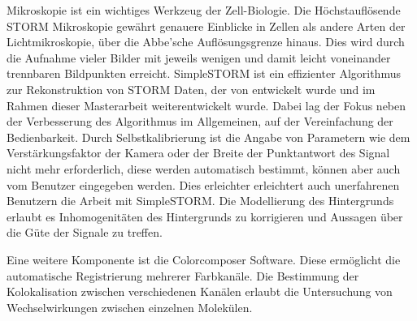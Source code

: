 Mikroskopie ist ein wichtiges Werkzeug der Zell-Biologie. Die H\"ochstaufl\"osende STORM Mikroskopie gew\"ahrt genauere Einblicke in Zellen als andere Arten der Lichtmikroskopie, \"uber die Abbe'sche Aufl\"osungsgrenze hinaus. Dies wird durch die Aufnahme vieler Bilder mit jeweils wenigen und damit leicht voneinander trennbaren Bildpunkten erreicht.\newline
SimpleSTORM ist ein effizienter Algorithmus zur Rekonstruktion von STORM Daten, der von \cite{MAJoachim} entwickelt wurde und im Rahmen dieser Masterarbeit weiterentwickelt wurde.\newline 
Dabei lag der Fokus neben der Verbesserung des Algorithmus im Allgemeinen, auf der Vereinfachung der Bedienbarkeit. Durch Selbstkalibrierung ist die Angabe von Parametern wie dem Verst\"arkungsfaktor der Kamera oder der Breite der Punktantwort des Signal nicht mehr erforderlich, diese werden automatisch bestimmt, k\"onnen aber auch vom Benutzer eingegeben werden. Dies erleichter erleichtert auch unerfahrenen Benutzern die Arbeit mit SimpleSTORM.\newline
Die Modellierung des Hintergrunds erlaubt es Inhomogenit\"aten des Hintergrunds zu korrigieren und Aussagen \"uber die G\"ute der Signale zu treffen.\newline

Eine weitere Komponente ist die Colorcomposer Software. Diese erm\"oglicht die automatische Registrierung mehrerer Farbkan\"ale. Die Bestimmung der Kolokalisation zwischen verschiedenen Kan\"alen erlaubt die Untersuchung von Wechselwirkungen zwischen einzelnen Molek\"ulen.